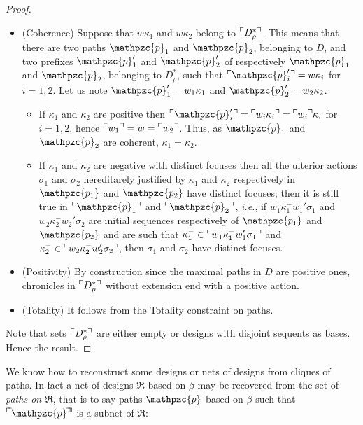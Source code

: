 \documentclass{LMCS}
\def\ie{{\em i.e.}}
\newcommand{\design}[1]{{\mathfrak{#1}}}
\newcommand{\pathLL}[1]{\mathpzc{#1}}\newcommand{\strategy}[1]{\pathLL{#1}}\newcommand{\view}[1]{\raisebox{.3ex}{$\ulcorner$}{#1}\raisebox{.3ex}{$\urcorner$}}\newcommand{\fullview}[1]{\raisebox{.3ex}{$\ulcorner\mkern-6mu\ulcorner\mkern-2mu$}{#1}\raisebox{.3ex}{$\mkern-2mu\urcorner\mkern-6mu\urcorner$}}\newcommand{\views}[1]{\view{#1}}\newcommand{\fullviews}[1]{\fullview{#1}}\newcommand{\shuffle}[1]{\llcorner\design{#1}\lrcorner}\newcommand{\PoD}[1]{{\mathcal{P}}_{#1}}\newcommand{\norm}[1]{\llbracket\design{#1}\rrbracket}
\begin{document}
\begin{proof}
\begin{itemize}
\item (Coherence) Suppose that $w\kappa_1$ and $w\kappa_2$ belong to $\views{D^*_{\rho}}$. This means that there are two paths $\pathLL{p}_1$ and $\pathLL{p}_2$, belonging to $D$, and two prefixes $\pathLL{p}_1'$ and $\pathLL{p}_2'$ of respectively $\pathLL{p}_1$ and $\pathLL{p}_2$, belonging to $D^*_{\rho}$, such that $\view{\pathLL{p}_i'}=w\kappa_i$ for $i = 1,2$. 
Let us note $\pathLL{p}'_1=w_1\kappa_1$ and
$\pathLL{p}'_2=w_2\kappa_2$.
\begin{itemize}[label=$-$]
\item If $\kappa_1$ and $\kappa_2$ are positive then $\view{\pathLL{p}_i'}=\view{w_i\kappa_i} =\view{w_i}\kappa_i$ for $i = 1,2$, hence $\view{w_1}=w=\view{w_2}$. Thus, as $\pathLL{p}_1$ and  $\pathLL{p}_2$ are coherent, $\kappa_1 = \kappa_2$.
\item If $\kappa_1$ and $\kappa_2$ are negative with distinct focuses  then all the ulterior actions $\sigma_1$ and $\sigma_2$ hereditarely justified by $\kappa_1$ and $\kappa_2$ respectively in $\pathLL{p_1}$ and $\pathLL{p_2}$  have distinct focuses; then it is still true in $\view{\pathLL{p}_1} $ and $\view{\pathLL{p}_2}$, \ie, if $w_1\kappa_1^-w_1'\sigma_1$  and  $w_2\kappa_2^-w_2'\sigma_2$ are initial sequences respectively of $\pathLL{p_1}$ and $\pathLL{p_2}$ and are such that  $\kappa^-_1\in\view{w_1\kappa_1^-w_1'\sigma_1}$ and $\kappa_2^-\in\view{w_2\kappa_2^-w_2'\sigma_2}$, then
$ \sigma_1$ and $\sigma_2$ have distinct focuses. 
\end{itemize}

\item (Positivity) By construction since the maximal paths in $D$ are positive ones, chronicles in $\views{D^*_{\rho}}$ without extension end with a positive action.

\item (Totality) It follows from the Totality constraint on paths.
\end{itemize}
Note that sets $\views{D^*_{\rho}}$ are either empty or designs with disjoint sequents as bases. Hence the result.
\end{proof}
 



 
We know how to reconstruct some designs or nets of designs from cliques of paths. In fact a net of designs $\design{R}$ based on $\beta$ may be recovered from the set of {\em paths on $\design{R}$}, that is to say paths $\pathLL{p}$ based on $\beta$ such that $\fullview{\pathLL{p}}$ is a subnet of $\design{R}$:
\end{document}
